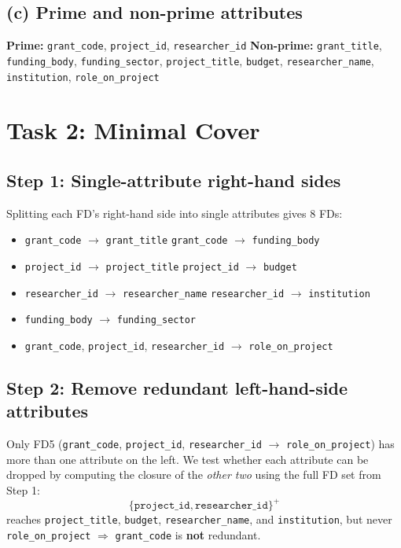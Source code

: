 \documentclass[11pt, letterpaper]{article}
\newcommand{\attr}[1]{\texttt{#1}}
\newcommand{\fd}{\ensuremath{\rightarrow}}
\newcommand{\clo}[1]{\ensuremath{\{#1\}^{+}}}
\begin{document}
\subsection*{(c) Prime and non-prime attributes}
\textbf{Prime:} \attr{grant\_code}, \attr{project\_id}, \attr{researcher\_id} \qquad \textbf{Non-prime:} \attr{grant\_title}, \attr{funding\_body}, \attr{funding\_sector}, \attr{project\_title}, \attr{budget}, \attr{researcher\_name}, \attr{institution}, \attr{role\_on\_project}

\section{Task 2: Minimal Cover}

\subsection*{Step 1: Single-attribute right-hand sides}
Splitting each FD's right-hand side into single attributes gives 8 FDs:
\begin{itemize}
  \item \attr{grant\_code} \fd{} \attr{grant\_title} \qquad \attr{grant\_code} \fd{} \attr{funding\_body}
  \item \attr{project\_id} \fd{} \attr{project\_title} \qquad \attr{project\_id} \fd{} \attr{budget}
  \item \attr{researcher\_id} \fd{} \attr{researcher\_name} \qquad \attr{researcher\_id} \fd{} \attr{institution}
  \item \attr{funding\_body} \fd{} \attr{funding\_sector}
  \item \attr{grant\_code}, \attr{project\_id}, \attr{researcher\_id} \fd{} \attr{role\_on\_project}
\end{itemize}

\subsection*{Step 2: Remove redundant left-hand-side attributes}
Only FD5 (\attr{grant\_code}, \attr{project\_id}, \attr{researcher\_id} \fd{} \attr{role\_on\_project}) has more than one attribute on the left. We test whether each attribute can be dropped by computing the closure of the \emph{other two} using the full FD set from Step 1:
\[
\clo{\attr{project\_id}, \attr{researcher\_id}}
\]
reaches \attr{project\_title}, \attr{budget}, \attr{researcher\_name}, and \attr{institution}, but never \attr{role\_on\_project} $\Rightarrow$ \attr{grant\_code} is \textbf{not} redundant.
\end{document}
